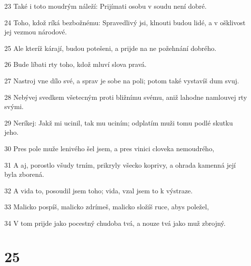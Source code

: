 \par 23 Také i toto moudrým náleží: Prijímati osobu v soudu není dobré.
\par 24 Toho, kdož ríká bezbožnému: Spravedlivý jsi, klnouti budou lidé, a v ošklivost jej vezmou národové.
\par 25 Ale kteríž kárají, budou potešeni, a prijde na ne požehnání dobrého.
\par 26 Bude líbati rty toho, kdož mluví slova pravá.
\par 27 Nastroj vne dílo své, a sprav je sobe na poli; potom také vystavíš dum svuj.
\par 28 Nebývej svedkem všetecným proti bližnímu svému, aniž lahodne namlouvej rty svými.
\par 29 Neríkej: Jakž mi ucinil, tak mu uciním; odplatím muži tomu podlé skutku jeho.
\par 30 Pres pole muže lenivého šel jsem, a pres vinici cloveka nemoudrého,
\par 31 A aj, porostlo všudy trním, prikryly všecko koprivy, a ohrada kamenná její byla zborená.
\par 32 A vida to, posoudil jsem toho; vida, vzal jsem to k výstraze.
\par 33 Malicko pospíš, malicko zdrímeš, malicko složíš ruce, abys poležel,
\par 34 V tom prijde jako pocestný chudoba tvá, a nouze tvá jako muž zbrojný.

\chapter{25}

